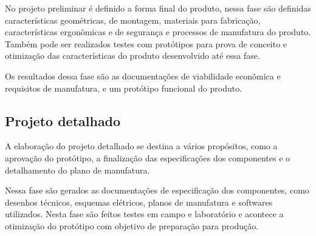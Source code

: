 No projeto preliminar é definido a forma final do produto, nessa fase são definidas características geométricas, de montagem, materiais para fabricação, características
ergonômicas e de segurança e processos de manufatura do produto. Também pode ser realizados testes com protótipos para prova de conceito e otimização das características
do produto desenvolvido até essa fase. \autocite{Back2008}

Os resultados dessa fase são as documentações de viabilidade econômica e requisitos de manufatura, e um protótipo funcional do produto.

\subsection{Projeto detalhado}

A elaboração do projeto detalhado se destina a vários propósitos, como a aprovação do protótipo, a finalização das especificações dos componentes e o detalhamento do plano
de manufatura. \autocite{Back2008}

Nessa fase são gerados as documentações de especificação dos componentes, como desenhos técnicos, esquemas elétricos, planos de manufatura e softwares utilizados. Nesta fase
são feitos testes em campo e laboratório e acontece a otimização do protótipo com objetivo de preparação para produção.
